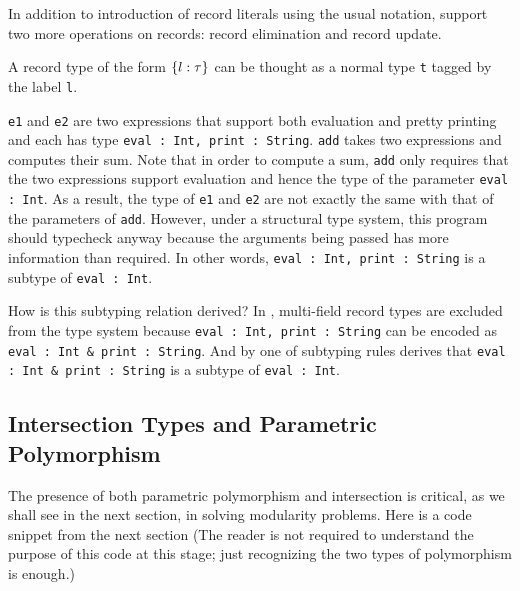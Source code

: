In addition to introduction of record literals using the usual
notation, \name support two more operations on records: record
elimination and record update.

A record type of the form $ \{ l : \tau \} $ can be thought as a normal type \lstinline{t}
tagged by the label \lstinline{l}.



\lstinline{e1} and \lstinline{e2} are two expressions that support both evaluation and pretty
printing and each has type \lstinline{eval : Int, print : String}. \lstinline{add} takes
two expressions and computes their sum. Note that in order to compute a sum,
\lstinline{add} only requires that the two expressions support evaluation and hence the
type of the parameter \lstinline{eval : Int}. As a result, the type of \lstinline{e1} and
\lstinline{e2} are not exactly the same with that of the parameters of \lstinline{add}. However,
under a structural type system, this program should typecheck anyway because the
arguments being passed has more information than required. In other words,
\lstinline{eval : Int, print : String} is a subtype of \lstinline{eval : Int}.

How is this subtyping relation derived? In \name, multi-field record types are
excluded from the type system because \lstinline{eval : Int, print : String} can
be encoded as \lstinline{eval : Int & print : String}. And by one of
subtyping rules derives that \lstinline{eval : Int & print : String} is a
subtype of \lstinline{eval : Int}.




\subsection{Intersection Types and Parametric Polymorphism}

The presence of both parametric polymorphism and intersection is critical, as we
shall see in the next section, in solving modularity problems. Here is a code
snippet from the next section (The reader is not required to understand the
purpose of this code at this stage; just recognizing the two types of
polymorphism is enough.)

